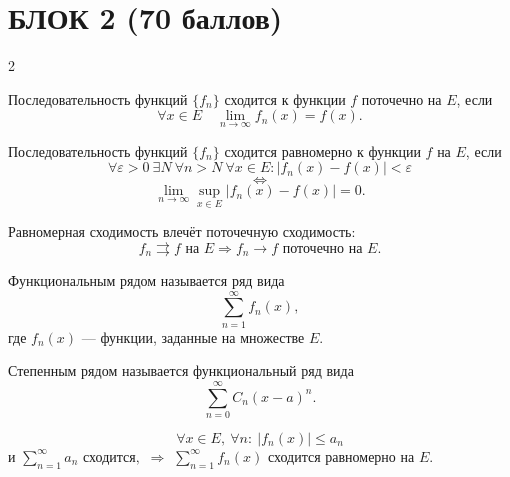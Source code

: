 \section{БЛОК 2 (70 баллов)}

\small
\setlength{\parskip}{1pt}
\setlength{\abovedisplayskip}{3pt}
\setlength{\belowdisplayskip}{3pt}
\setlength{\abovedisplayshortskip}{2pt}
\setlength{\belowdisplayshortskip}{2pt}

\begin{multicols}{2}

\begin{definition}
    Последовательность функций $\{f_n\}$ сходится к функции $f$ поточечно на $E$, если
    \[
        \forall x \in E
        \quad
        \lim_{n \to \infty} f_n(x) = f(x).
    \]
\end{definition}

\begin{definition}
    Последовательность функций $\{f_n\}$ сходится равномерно к функции $f$ на $E$, если
    \[
        \forall \varepsilon > 0\ \exists N\ \forall n > N\ \forall x \in E:
        |f_n(x) - f(x)| < \varepsilon
    \]
    \[
        \Longleftrightarrow
    \]
    \[
        \lim_{n \to \infty}
        \sup_{x \in E}|f_n(x) - f(x)| = 0.
    \]
\end{definition}

\begin{theorem}
    Равномерная сходимость влечёт поточечную сходимость:
    \[
        f_n \rightrightarrows f \text{ на } E
        \Rightarrow
        f_n \to f \text{ поточечно на } E.
    \]
\end{theorem}

\begin{definition}
    Функциональным рядом называется ряд вида
    \[
        \sum_{n=1}^{\infty} f_n(x),
    \]
    где $f_n(x)$ --- функции, заданные на множестве $E$.
\end{definition}

\begin{definition}
    Степенным рядом называется функциональный ряд вида
    \[
        \sum_{n=0}^{\infty} C_n(x-a)^n.
    \]
\end{definition}

\begin{theorem}
    \[
        \forall x \in E,\ \forall n:\ |f_n(x)| \leq a_n
    \]
    и
    $
        \sum_{n=1}^{\infty} a_n \text{ сходится},
    $
    $\Rightarrow$
    $\sum_{n=1}^{\infty} f_n(x)$
    сходится равномерно на $E$.
\end{theorem}


\end{multicols}
